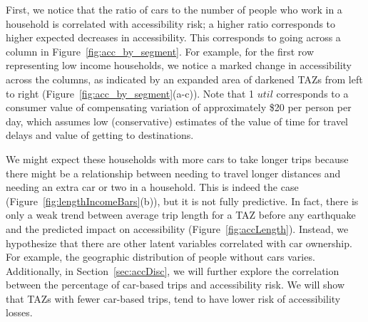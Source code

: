 First, we notice that the ratio of cars to the number of people who work in a household is  correlated with accessibility risk; a higher ratio corresponds to higher expected decreases in accessibility. This corresponds to going across a column in Figure~\ref{fig:acc_by_segment}. For example, for the first row representing low income households, 
 we notice a marked change in accessibility across the columns, as indicated by an expanded area of darkened TAZs from left to right (Figure~\ref{fig:acc_by_segment}{(a-c)}). Note that 1 $util$ corresponds to a consumer value of compensating variation of approximately \$20 per person per day, which assumes low (conservative) estimates of the value of time for travel delays and value of getting to destinations. 
 
We might expect these households with more cars to take longer trips because there might be a relationship between needing to travel longer distances and needing an extra car or two in a household. This is indeed the case (Figure~\ref{fig:lengthIncomeBars}{(b)}), but it is not fully predictive. In fact, there is only a weak trend between average trip length for a TAZ before any earthquake and the predicted impact on accessibility (Figure~\ref{fig:accLength}). Instead, we hypothesize that there are other latent variables correlated with car ownership. For example, the geographic distribution of people without cars varies. Additionally, in Section~\ref{sec:accDisc}, we will further explore the correlation between the percentage of car-based trips and accessibility risk. We will show that TAZs with fewer car-based trips, tend to have lower risk of accessibility losses.



